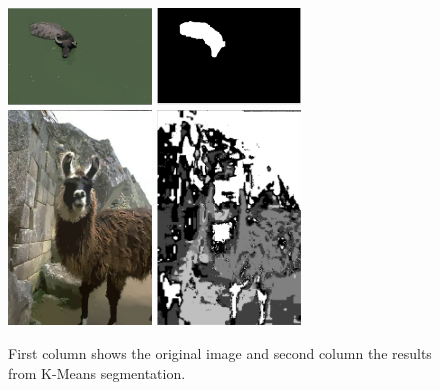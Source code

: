 \documentclass[10pt, twocolumn, twoside]{article}
\begin{document}
\begin{figure}[h!]
    \centering
    \includegraphics[width=1.5in]{images/80099.png}
    \includegraphics[width=1.5in]{images/80099k.png}
    \includegraphics[width=1.5in]{images/6046.png}
    \includegraphics[width=1.5in]{images/6046k.png}

    \caption{First column shows the original image and second column the results from K-Means segmentation.}
    \label{fig:reg33}
\end{figure}

\end{document}
